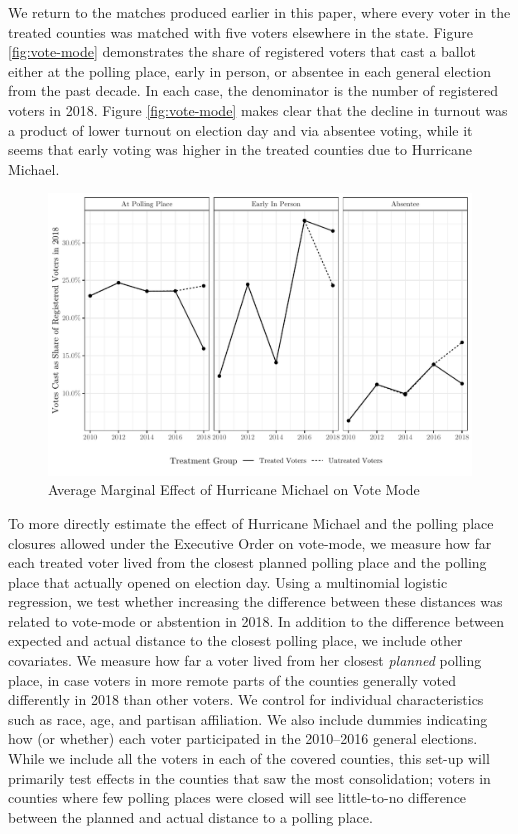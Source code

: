 \documentclass[
  12pt,
]{article}
\begin{document}
We return to the matches produced earlier in this paper, where every voter in the treated counties was matched with five voters elsewhere in the state. Figure \ref{fig:vote-mode} demonstrates the share of registered voters that cast a ballot either at the polling place, early in person, or absentee in each general election from the past decade. In each case, the denominator is the number of registered voters in 2018. Figure \ref{fig:vote-mode} makes clear that the decline in turnout was a product of lower turnout on election day and via absentee voting, while it seems that early voting was higher in the treated counties due to Hurricane Michael.

\begin{figure}[h]

{\centering \includegraphics{hurricane_michael_files/figure-latex/vote-mode-chunk-1} 

}

\caption{\label{fig:vote-mode}Average Marginal Effect of Hurricane Michael on Vote Mode}\label{fig:vote-mode-chunk}
\end{figure}

To more directly estimate the effect of Hurricane Michael and the polling place closures allowed under the Executive Order on vote-mode, we measure how far each treated voter lived from the closest planned polling place and the polling place that actually opened on election day. Using a multinomial logistic regression, we test whether increasing the difference between these distances was related to vote-mode or abstention in 2018. In addition to the difference between expected and actual distance to the closest polling place, we include other covariates. We measure how far a voter lived from her closest \emph{planned} polling place, in case voters in more remote parts of the counties generally voted differently in 2018 than other voters. We control for individual characteristics such as race, age, and partisan affiliation. We also include dummies indicating how (or whether) each voter participated in the 2010--2016 general elections. While we include all the voters in each of the covered counties, this set-up will primarily test effects in the counties that saw the most consolidation; voters in counties where few polling places were closed will see little-to-no difference between the planned and actual distance to a polling place.
\end{document}
